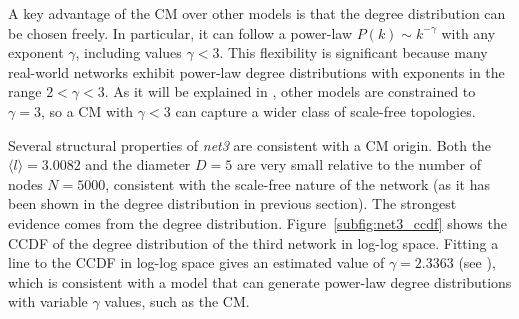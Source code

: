 \documentclass{article}
\begin{document}
A key advantage of the CM over other models is that the degree distribution can be chosen freely. In particular, it can follow a power-law $P(k)\sim k^{-\gamma}$ with any exponent $\gamma$, including values $\gamma < 3$. This flexibility is significant because many real-world networks exhibit power-law degree distributions with exponents in the range $2 < \gamma < 3$. As it will be explained in , other models are constrained to $\gamma = 3$, so a CM with $\gamma < 3$ can capture a wider class of scale-free topologies.

Several structural properties of \textit{net3} are consistent with a CM origin. Both the $\langle l \rangle = 3.0082$  and the diameter $D = 5$ are very small relative to the number of nodes $N = 5000$, consistent with the scale-free nature of the network (as it has been shown in the degree distribution in previous section). The strongest evidence comes from the degree distribution. Figure~\ref{subfig:net3_ccdf} shows the CCDF of the degree distribution of the third network in log-log space. Fitting a line to the CCDF in log-log space gives an estimated value of $\gamma = 2.3363$ (see ), which is consistent with a model that can generate power-law degree distributions with variable $\gamma$ values, such as the CM.
\end{document}
